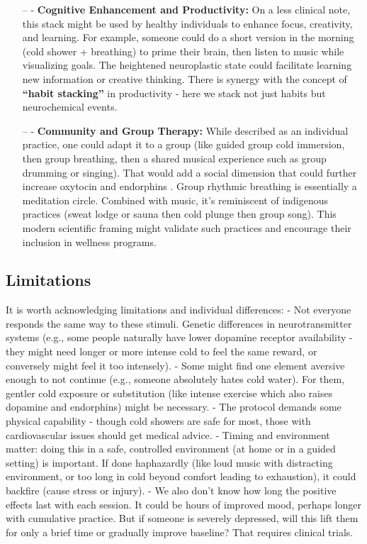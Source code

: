 \documentclass[11pt]{article}
\newcommand{\quotes}[1]{``#1''}
\begin{document}
\begin{itemize}
\item[--] - \textbf{Cognitive Enhancement and Productivity:} On a less clinical note, this stack might be used by healthy individuals to enhance focus, creativity, and learning. For example, someone could do a short version in the morning (cold shower + breathing) to prime their brain, then listen to music while visualizing goals. The heightened neuroplastic state could facilitate learning new information or creative thinking. There is synergy with the concept of \textbf{\quotes{habit stacking}} in productivity - here we stack not just habits but neurochemical events.
\item[--] - \textbf{Community and Group Therapy:} While described as an individual practice, one could adapt it to a group (like guided group cold immersion, then group breathing, then a shared musical experience such as group drumming or singing). That would add a social dimension that could further increase oxytocin and endorphins \cite{dunbarMusic}. Group rhythmic breathing is essentially a meditation circle. Combined with music, it's reminiscent of indigenous practices (sweat lodge or sauna then cold plunge then group song). This modern scientific framing might validate such practices and encourage their inclusion in wellness programs.
\end{itemize}

\subsection{Limitations}

It is worth acknowledging limitations and individual differences:
- Not everyone responds the same way to these stimuli. Genetic differences in neurotransmitter systems (e.g., some people naturally have lower dopamine receptor availability - they might need longer or more intense cold to feel the same reward, or conversely might feel it too intensely).
- Some might find one element aversive enough to not continue (e.g., someone absolutely hates cold water). For them, gentler cold exposure or substitution (like intense exercise which also raises dopamine and endorphins) might be necessary.
- The protocol demands some physical capability - though cold showers are safe for most, those with cardiovascular issues should get medical advice.
- Timing and environment matter: doing this in a safe, controlled environment (at home or in a guided setting) is important. If done haphazardly (like loud music with distracting environment, or too long in cold beyond comfort leading to exhaustion), it could backfire (cause stress or injury).
- We also don't know how long the positive effects last with each session. It could be hours of improved mood, perhaps longer with cumulative practice. But if someone is severely depressed, will this lift them for only a brief time or gradually improve baseline? That requires clinical trials.
\end{document}

